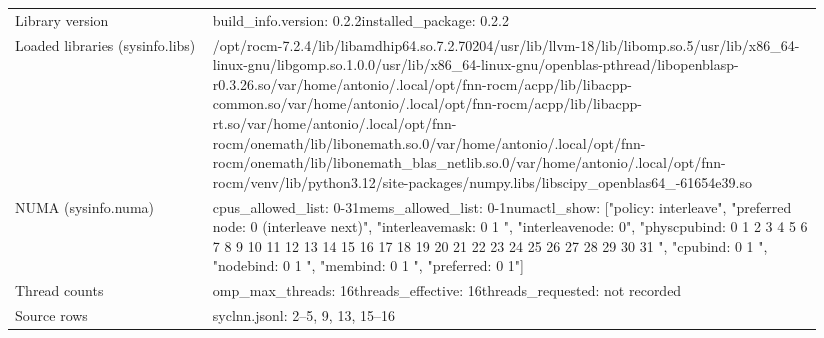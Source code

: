 \begin{longtable}{>{\raggedright\arraybackslash}p{0.23\linewidth}>{\raggedright\arraybackslash}p{0.71\linewidth}}
Library version & build\_\allowbreak{}info.version: 0.2.2\newline installed\_\allowbreak{}package: 0.2.2 \\
Loaded libraries (sysinfo.libs) & /\allowbreak{}opt/\allowbreak{}rocm-7.2.4/\allowbreak{}lib/\allowbreak{}libamdhip64.so.7.2.70204\newline /\allowbreak{}usr/\allowbreak{}lib/\allowbreak{}llvm-18/\allowbreak{}lib/\allowbreak{}libomp.so.5\newline /\allowbreak{}usr/\allowbreak{}lib/\allowbreak{}x86\_\allowbreak{}64-linux-gnu/\allowbreak{}libgomp.so.1.0.0\newline /\allowbreak{}usr/\allowbreak{}lib/\allowbreak{}x86\_\allowbreak{}64-linux-gnu/\allowbreak{}openblas-pthread/\allowbreak{}libopenblasp-r0.3.26.so\newline /\allowbreak{}var/\allowbreak{}home/\allowbreak{}antonio/\allowbreak{}.local/\allowbreak{}opt/\allowbreak{}fnn-rocm/\allowbreak{}acpp/\allowbreak{}lib/\allowbreak{}libacpp-common.so\newline /\allowbreak{}var/\allowbreak{}home/\allowbreak{}antonio/\allowbreak{}.local/\allowbreak{}opt/\allowbreak{}fnn-rocm/\allowbreak{}acpp/\allowbreak{}lib/\allowbreak{}libacpp-rt.so\newline /\allowbreak{}var/\allowbreak{}home/\allowbreak{}antonio/\allowbreak{}.local/\allowbreak{}opt/\allowbreak{}fnn-rocm/\allowbreak{}onemath/\allowbreak{}lib/\allowbreak{}libonemath.so.0\newline /\allowbreak{}var/\allowbreak{}home/\allowbreak{}antonio/\allowbreak{}.local/\allowbreak{}opt/\allowbreak{}fnn-rocm/\allowbreak{}onemath/\allowbreak{}lib/\allowbreak{}libonemath\_\allowbreak{}blas\_\allowbreak{}netlib.so.0\newline /\allowbreak{}var/\allowbreak{}home/\allowbreak{}antonio/\allowbreak{}.local/\allowbreak{}opt/\allowbreak{}fnn-rocm/\allowbreak{}venv/\allowbreak{}lib/\allowbreak{}python3.12/\allowbreak{}site-packages/\allowbreak{}numpy.libs/\allowbreak{}libscipy\_\allowbreak{}openblas64\_\allowbreak{}-61654e39.so \\
NUMA (sysinfo.numa) & cpus\_\allowbreak{}allowed\_\allowbreak{}list: 0-31\newline mems\_\allowbreak{}allowed\_\allowbreak{}list: 0-1\newline numactl\_\allowbreak{}show: ["policy: interleave", "preferred node: 0 (interleave next)", "interleavemask: 0 1 ", "interleavenode: 0", "physcpubind: 0 1 2 3 4 5 6 7 8 9 10 11 12 13 14 15 16 17 18 19 20 21 22 23 24 25 26 27 28 29 30 31 ", "cpubind: 0 1 ", "nodebind: 0 1 ", "membind: 0 1 ", "preferred: 0 1"] \\
Thread counts & omp\_\allowbreak{}max\_\allowbreak{}threads: 16\newline threads\_\allowbreak{}effective: 16\newline threads\_\allowbreak{}requested: not recorded \\
Source rows & syclnn.jsonl: 2–5, 9, 13, 15–16 \\
\end{longtable}
